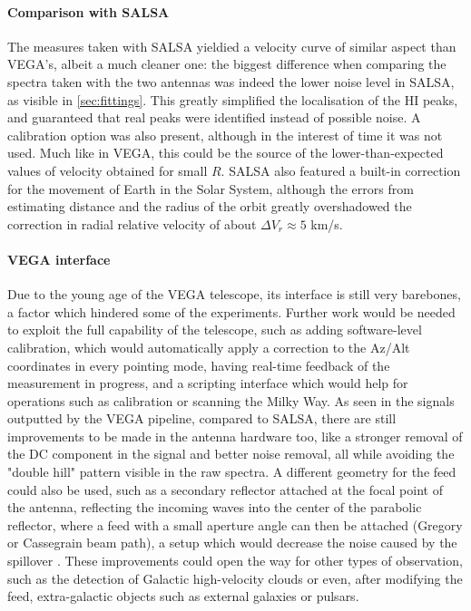 \paragraph{Comparison with SALSA}
The measures taken with SALSA yieldied a velocity curve of similar aspect than VEGA's, albeit a much cleaner one:
the biggest difference when comparing the spectra taken with the two antennas was indeed the lower noise level in SALSA, as visible in \autoref{sec:fittings}. 
This greatly simplified the localisation of the HI peaks, and guaranteed that real peaks were identified instead of possible noise.
A calibration option was also present, although in the interest of time it was not used. Much like in VEGA, this could be the source of the lower-than-expected values of velocity obtained for small $R$. 
SALSA also featured a built-in correction for the movement of Earth in the Solar System, although the errors from estimating distance and the radius of the orbit greatly overshadowed the correction in radial relative velocity of about $\Delta V_r \approx 5$ km/s.



\paragraph{VEGA interface}
Due to the young age of the VEGA telescope, its interface is still very barebones, a factor which hindered some of the experiments. Further work would be needed to exploit the full capability of the telescope, such as adding software-level calibration, which would automatically apply a correction to the Az/Alt coordinates in every pointing mode, having real-time feedback of the measurement in progress, and a scripting interface which would help for operations such as calibration or scanning the Milky Way. As seen in the signals outputted by the VEGA pipeline, compared to SALSA, there are still improvements to be made in the antenna hardware too, like a stronger removal of the DC component in the signal and better noise removal, all while avoiding the "double hill" pattern visible in the raw spectra. 
A different geometry for the feed could also be used, such as a secondary reflector attached at the focal point of the antenna, reflecting the incoming waves into the center of the parabolic reflector, where a feed with a small aperture angle can then be attached (Gregory or Cassegrain
beam path), a setup which would decrease the noise caused by the spillover \cite{lauterbach_radio_2022}.
These improvements could open the way for other types of observation, such as the detection of Galactic high-velocity clouds or even, after modifying the feed,  extra-galactic objects such as external galaxies or pulsars. 
